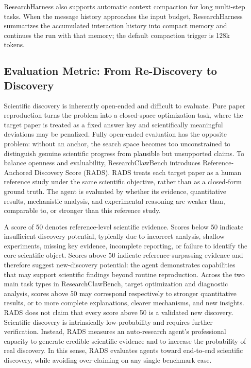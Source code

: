 ResearchHarness also supports automatic context compaction for long multi-step tasks. When the message history approaches the input budget, ResearchHarness summarizes the accumulated interaction history into compact memory and continues the run with that memory; the default compaction trigger is 128k tokens.


\subsection{Evaluation Metric: From Re-Discovery to Discovery}

Scientific discovery is inherently open-ended and difficult to evaluate. Pure paper reproduction turns the problem into a closed-space optimization task, where the target paper is treated as a fixed answer key and scientifically meaningful deviations may be penalized. Fully open-ended evaluation has the opposite problem: without an anchor, the search space becomes too unconstrained to distinguish genuine scientific progress from plausible but unsupported claims. To balance openness and evaluability, ResearchClawBench introduces Reference-Anchored Discovery Score (RADS). RADS treats each target paper as a human reference study under the same scientific objective, rather than as a closed-form ground truth. The agent is evaluated by whether its evidence, quantitative results, mechanistic analysis, and experimental reasoning are weaker than, comparable to, or stronger than this reference study.

A score of 50 denotes reference-level scientific evidence. Scores below 50 indicate insufficient discovery potential, typically due to incorrect analysis, shallow experiments, missing key evidence, incomplete reporting, or failure to identify the core scientific object. Scores above 50 indicate reference-surpassing evidence and therefore suggest new-discovery potential: the agent demonstrates capabilities that may support scientific findings beyond routine reproduction. Across the two main task types in ResearchClawBench, target optimization and diagnostic analysis, scores above 50 may correspond respectively to stronger quantitative results, or to more complete explanations, clearer mechanisms, and new insights. RADS does not claim that every score above 50 is a validated new discovery. Scientific discovery is intrinsically low-probability and requires further verification. Instead, RADS measures an auto-research agent's professional capacity to generate credible scientific evidence and to increase the probability of real discovery. In this sense, RADS evaluates agents toward end-to-end scientific discovery, while avoiding over-claiming on any single benchmark case.

